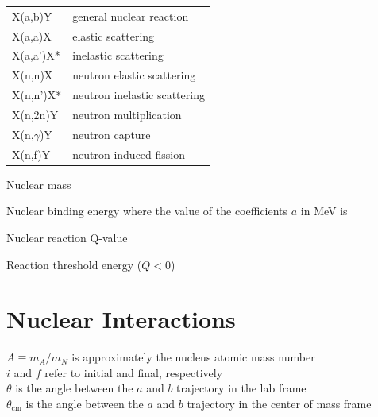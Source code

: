 \begin{table}[H]
  \begin{tabular}{l l}
    X(a,b)Y & general nuclear reaction\\
    X(a,a)X & elastic scattering\\
    X(a,a')X* & inelastic scattering\\
    X(n,n)X & neutron elastic scattering\\
    X(n,n')X* & neutron inelastic scattering\\
    X(n,2n)Y & neutron multiplication\\
    X(n,$\gamma$)Y & neutron capture\\
    X(n,f)Y & neutron-induced fission\\
  \end{tabular}
  \end{table}

\noindent
Nuclear mass 

\noindent
Nuclear binding energy  
\indent
where the value of the coefficients $a$ in MeV is 

\noindent
Nuclear reaction Q-value 

\noindent
Reaction threshold energy ($Q<0$) 

\section{Nuclear Interactions}
$A\equiv m_A/{m_N}$ is approximately the nucleus atomic mass number \\
$i$ and $f$ refer to initial and final, respectively\\
$\theta$ is the angle between the $a$ and $b$ trajectory in the lab frame\\
$\theta_\mathrm{cm}$ is the angle between the $a$ and $b$ trajectory in the center of mass frame\\

